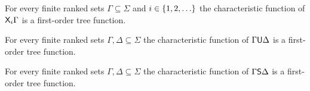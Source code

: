     \begin{lemma}\label{lem:nextmod}
        For every finite ranked sets $\Gamma \subseteq \Sigma$ and $i \in \{1,2,\ldots\}$ the characteristic function of $\mathsf X_i \Gamma$ is a first-order tree function.
    \end{lemma}
\begin{pr}
    
\end{pr}

\begin{lemma}\label{lem:untilmod}
    For every finite ranked sets $\Gamma, \Delta \subseteq \Sigma$  the characteristic function of $\Gamma \mathsf U \Delta$ is a first-order tree function.
\end{lemma}
\begin{pr}

\end{pr}


\begin{lemma}\label{lem:sincemod}
    For every finite ranked sets $\Gamma, \Delta \subseteq \Sigma$  the characteristic function of $\Gamma \mathsf S \Delta$ is a first-order tree function.
\end{lemma}
\begin{pr}

\end{pr}

         
